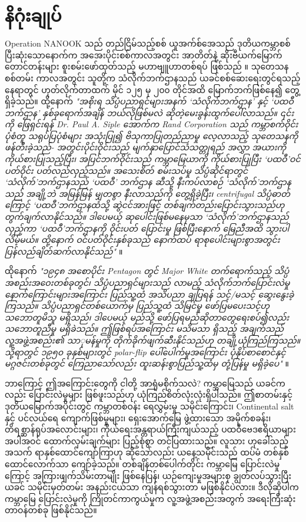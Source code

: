 \documentclass[10pt,twocolumn,letterpaper]{article}
\begin{document}
\section{နိဂုံးချုပ်}

Operation NANOOK သည် တည်ငြိမ်သည့်စစ် ယူအက်စ်အေသည် ဒုတိယကမ္ဘာစစ်ပြီးဆုံးသောနောက်က အအေးပိုင်းစစ်ကာလအတွင်း အာတိတ်နဲ့ ဆိုးဗီယက်မြောက်တောင်တန်းများ စူးစမ်းဖော်ထုတ်သည့် မဟာဗျူဟာတစ်ရပ် ဖြစ်သည် \cite{137}။ သုတေသန စစ်တမ်း ကာလအတွင်း သူတို့က သံလိုက်ဘက်ဌာနသည် ယခင်စစ်ဆေးရေးတွင်ရသည့်နေရာတွင် ဟုတ်လိုက်တာထက် မိုင် ၁၂၅ မှ ၂၀၀ တိုင်အထိ မြောက်ဘက်ဖြစ်နေ၍ တွေ့ရှိခဲ့သည်။ ထို့နောက် \textit{"အစိုးရ သိပ္ပံပညာရှင်များအနက် ‘သံလိုက်ဘက်ဌာန’ နှင့် ‘ပထဝီဘက်ဌာန’ နှစ်ခုရောက်အချိန် ဘယ်လိုဖြစ်မလဲ ဆိုတဲ့မေးခွန်းထွက်ပေါ်လာသည်။ ၎င်းကို ဖြေရှင်းရန် Dr. Paul A. Siple အောက်က Rand Corporation သည် ကမ္ဘာစက်ဝိုင်းပုံစံတူ သရုပ်ပြပုံစံများ အသုံးပြု၍ ဗိသုကာပြုတည်ညာမှု လေ့လာသည့် သုတေသနကို ဖန်တီးခဲ့သည်- အတွင်းပိုင်းဝိုင်းသည် မျက်နှာပြောင်သံသတ္တုရည် အလွှာ အယားကို ကိုယ်စားပြုသည့်ပြီး၊ အပြင်ဘက်ဝိုင်းသည် ကမ္ဘာမြေယာကို ကိုယ်စားပြုပြီး ‘ပထဝီ’ဝင်ပတ်ဝိုင်း ပတ်လည်လှည့်သည်။ အသေးစိတ် စမ်းသပ်မှု သိပ္ပံဆိုင်ရာတွင် ‘သံလိုက်’ဘက်ဌာနသည် ‘ပထဝီ’ ဘက်ဌာန ဆီသို့ နီးကပ်လာစဉ် ‘သံလိုက်’ဘက်ဌာနသည် အချို့ဘဲ အမြန်မြန် မျှတစွာ နီးလာသည်ကို တွေ့ရှိခဲ့ပြီး၊ centrifugal သိပ္ပံဓာတ်ကြောင့် ‘ပထဝီ’ဘက်ဌာနထံသို့ ဆွဲငင်အားဖြင့် တစ်ချက်တည်းပြောင်းသွားသည်ဟု တွက်ချက်လာနိုင်သည်။ ဒါပေမယ့် ဆုပေါင်းဖြစ်မနေမှသာ ‘သံလိုက်’ဘက်ဌာနသည် လှည့်ကာ ‘ပထဝီ’ဘက်ဌာနကို ဝိုင်းပတ် ပြောင်းမှု ဖြစ်ပြီးနောက် မြေညီအထိ သွားပါလိမ့်မယ်။ ထို့နောက် ဝင်ပတ်ဝိုင်းနှစ်ခုသည် နောက်ထပ် ရာစုပေါင်းများစွာအတွင်း ပြန်လည်ချိတ်ဆက်လာနိုင်သည်"} \cite{138,139}။

ထိုနောက်  \textit{"၁၉၄၈ အစောပိုင်း Pentagon တွင် Major White တက်ရောက်သည့် သိပ္ပံအစည်းအဝေးတစ်ခုတွင်၊ သိပ္ပံပညာရှင်များသည် လာမည့် သံလိုက်ဘက်ပြောင်းလဲမှု နောက်ကြောင်းများအကြောင်း ပြည်သူ့ထံ အသိပညာ ချပြရန် သင့်/မသင့် ဆွေးနွေးခဲ့ကြသည်။ သိပ္ပံပညာရှင်တစ်ယောက်မှ ပြည်သူ့ထံ သိမြင်မှု ဖော်ပြမပေးသင့်ဟု သဘောတူမိသူ မရှိသည်၊ ဒါပေမယ့် မည်သို့ ဖော်ပြရမည်ဆိုတာတွေရေးစပ်၍လည်း သဘောတူညီမှု မရှိခဲသည်။ ဤဖြစ်ရပ်အကြောင်း မသိမသာ ရှိသည့် အချက်သည် လူ့အဖွဲ့အစည်း၏ သာုမန်မှုကို တိုက်ခိုက်ဖျက်ဆီးနိုင်သည်ဟု တချို့ယုံကြည်ကြသည်။ သို့ရာတွင် ၁၉၅၀ ခုနှစ်များတွင် polar-flip ပေါ်ပေါက်မှုအကြောင်း ပုံနှိပ်စာစောင်နှင့် မဂ္ဂဇင်းတစ်ခုတွင် ကြေညာသော်လည်း ထူးဆန်းစွာပြည်သူ့ထံမှ တုံ့ပြန်မှု မရှိခဲ့ပေ"} \cite{138,139}။

ဘာကြောင့် ဤအကြောင်းတွေကို ငါတို့ အာရုံမစိုက်သလဲ? ကမ္ဘာမြေသည် ယခင်ကလည်း ပြောင်းလဲမှုများ ဖြစ်ဖူးသည်ဟု ယုံကြည်စိတ်လုံးလုံးရှိပါသည်။ ဤစာတမ်းနှင့် ဒုတိယမြောက်အပိုင်းတွင် ကမ္ဘာတစ်ဝန်း ရေလွှမ်းမှု သမိုင်းကြောင်း၊ Continental salt နှင့် ပင်လယ်ရေ ကျောက်ဖြစ်မှုများ၊ ရှေးအောက်မြေ ဖွဲ့ထားသော အမိုက်စခန်း၊ တိရစ္ဆာန်ရုပ်အလောင်းများ၊ ကိုယ်ရေးအန္တရာယ်ကြီးကျယ်သည့် ပထဝီဗေဒဧရိယာများအပါအဝင် ထောက်လှမ်းချက်များ ပြည့်စုံစွာ တင်ပြထားသည်။ လူသား ဟုခေါ်သည့်အသက် ရာနှစ်ထောင်ကျော်ကြာဟု ဆိုသော်လည်း ယနေ့သမိုင်းသည် ထပ်မံ တစ်နှစ်ထောင်လောက်သာ ကျော်ခဲ့သည်။ တစ်ချိန်တစ်ပေါက်တိုင်း ကမ္ဘာမြေ ပြောင်းလဲမှုကြောင့် အကြားဖျက်သိမ်းတာမျိုး ဖြစ်နေပြန်၊ ယဉ်ကျေးမှုအများစု ချွတ်လပ်သွားပြီး ယခင် သမိုင်းမှတ်တမ်း အနည်းငယ်သာ ကျန်ရစ်သွားတာ မဖြစ်နိုင်ပဲလား။ ဒီလိုဆိုပါက ကမ္ဘာမြေ ပြောင်းလဲမှုကို ကြိုတင်ကာကွယ်မှုက လူ့အဖွဲ့အစည်းအတွက် အရေးကြီးဆုံးတာဝန်တစ်ခု ဖြစ်နိုင်သည်။
\end{document}
